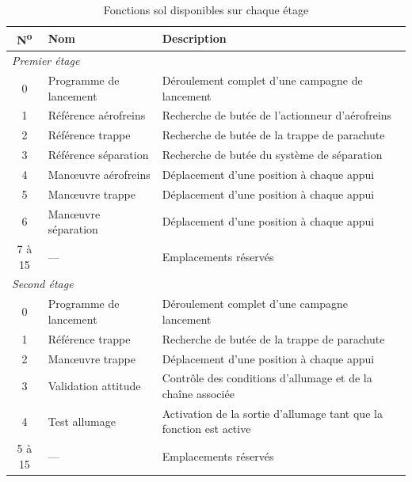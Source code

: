 \newpage

\begin{table}[H]
    \centering
    \begin{tabular}{c l l}
        \hline
        \textbf{N\textsuperscript{o}} & \textbf{Nom} & \textbf{Description} \\
        \hline
        \multicolumn{3}{l}{\textit{Premier étage}} \\
        \hline
		0 & Programme de lancement & Déroulement complet d'une campagne de lancement \\
        1 & Référence aérofreins & Recherche de butée de l'actionneur d'aérofreins \\
        2 & Référence trappe & Recherche de butée de la trappe de parachute \\
        3 & Référence séparation & Recherche de butée du système de séparation \\
        4 & Man\oe uvre aérofreins & Déplacement d'une position à chaque appui \\
        5 & Man\oe uvre trappe & Déplacement d'une position à chaque appui \\
        6 & Man\oe uvre séparation & Déplacement d'une position à chaque appui \\
        7 à 15 & --- & Emplacements réservés \\
        \hline
        \multicolumn{3}{l}{\textit{Second étage}} \\
        \hline
		0 & Programme de lancement & Déroulement complet d'une campagne lancement \\
        1 & Référence trappe & Recherche de butée de la trappe de parachute \\
        2 & Man\oe uvre trappe & Déplacement d'une position à chaque appui \\
        3 & Validation attitude & Contrôle des conditions d'allumage et de la chaîne associée \\
        4 & Test allumage & Activation de la sortie d'allumage tant que la fonction est active \\
        5 à 15 & --- & Emplacements réservés \\
        \hline
    \end{tabular}
    \caption{Fonctions sol disponibles sur chaque étage}
    \label{tab:ground_funcs}
\end{table}

\vspace{-0.8cm}

